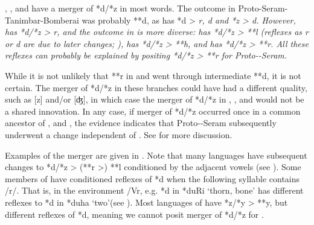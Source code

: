 , , and  have
a merger of *d/*z in most words.
The outcome in Proto-Seram-Tanimbar-Bomberai was
probably **d, as  has *d > \it{r,
d} and *z > \it{d}.
However,  has *d/*z > \it{r},
and the outcome in  is more diverse:  has *d/*z > **l (reflexes as \it{r} or \it{d} are due to later changes; ),
 has *d/*z > **h,
and  has *d/*z > **r.
All these  reflexes can probably be explained
by positing *d/*z > **r for Proto--Seram.

While it is not unlikely that **r in 
and  went through intermediate **d,
it is not certain.
The merger of *d/*z in these branches could have
had a different quality,
such as [z] and/or [ʤ],
in which case the merger of *d/*z in ,
, and  would not be a shared innovation.
In any case, if merger of *d/*z occurred once in a common ancestor
of ,  and , the evidence indicates
that Proto--Seram subsequently underwent a change independent of .
See  for more discussion.

Examples of the merger are given in .
Note that many  languages have subsequent
changes to *d/*z > (**r >) **l conditioned by the adjacent vowels (see ).
Some members of  have conditioned reflexes
of *d when the following syllable contains /r/.
That is, in the environment /{\gap}Vr, e.g.
*d in *duRi ‘thorn,
bone’ has different reflexes to *d in *duha ‘two’(see ).
Most languages of  have *z/*y > **y,
but different reflexes of *d,
meaning we cannot posit merger of *d/*z for .


